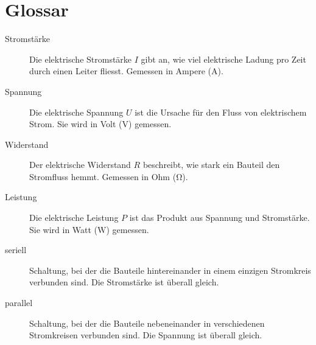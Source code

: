 \chapter{Glossar}

\begin{description}
    \item[Stromstärke] Die elektrische Stromstärke $I$ gibt an, wie viel elektrische Ladung pro Zeit durch einen Leiter fliesst. Gemessen in Ampere ($\unit{\ampere}$).

    \item[Spannung] Die elektrische Spannung $U$ ist die Ursache für den Fluss von elektrischem Strom. Sie wird in Volt ($\unit{\volt}$) gemessen.

    \item[Widerstand] Der elektrische Widerstand $R$ beschreibt, wie stark ein Bauteil den Stromfluss hemmt. Gemessen in Ohm ($\unit{\ohm}$).

    \item[Leistung] Die elektrische Leistung $P$ ist das Produkt aus Spannung und Stromstärke. Sie wird in Watt ($\unit{\watt}$) gemessen.

    \item[seriell] Schaltung, bei der die Bauteile hintereinander in einem einzigen Stromkreis verbunden sind. Die Stromstärke ist überall gleich.

    \item[parallel] Schaltung, bei der die Bauteile nebeneinander in verschiedenen Stromkreisen verbunden sind. Die Spannung ist überall gleich.
\end{description}
